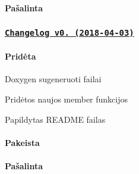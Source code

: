 \paragraph*{Pašalinta}

\subsubsection*{\href{https://github.com/PauliusKu/OP-3/releases/tag/v0.2}{\tt Changelog v0. (2018-\/04-\/03)}}

\paragraph*{Pridėta}


\begin{DoxyItemize}
\item Doxygen sugeneruoti failai
\item Pridėtos naujos member funkcijos
\item Papildytas R\+E\+A\+D\+ME failas \paragraph*{Pakeista}
\end{DoxyItemize}

\paragraph*{Pašalinta}